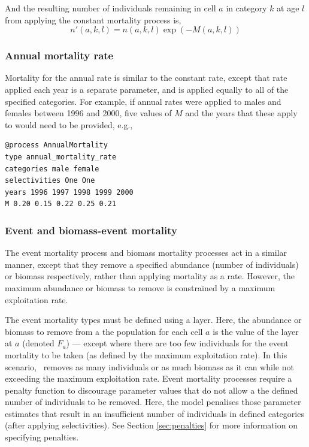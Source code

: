 And the resulting number of individuals remaining in cell $a$ in category $k$ at age $l$ from applying the constant mortality process is,
\begin{equation}
  n'(a,k,l) = n(a,k,l) \exp \left({-M(a,k,l)}\right)
\end{equation}

\subsubsection*{Annual mortality rate}

Mortality for the annual rate is similar to the constant rate, except that rate applied each year is a separate parameter, and is applied equally to all of the specified categories. For example, if annual rates were applied to males and females between 1996 and 2000, five values of $M$ and the years that these apply to would need to be provided, e.g., 

{\small{\begin{verbatim}
@process AnnualMortality
type annual_mortality_rate
categories male female
selectivities One One
years 1996 1997 1998 1999 2000
M 0.20 0.15 0.22 0.25 0.21
\end{verbatim}}}

\subsubsection*{Event and biomass-event mortality}

The event mortality process and biomass mortality processes act in a similar manner, except that they remove a specified abundance (number of individuals) or biomass respectively, rather than applying mortality as a rate. However, the maximum abundance or biomass to remove is constrained by a maximum exploitation rate.

The event mortality types must be defined using a layer. Here, the abundance or biomass to remove from a the population for each cell $a$ is the value of the layer at $a$ (denoted $F_a$) --- except where there are too few individuals for the event mortality to be taken (as defined by the maximum exploitation rate). In this scenario, \SPM\ removes as many individuals or as much biomass as it can while not exceeding the maximum exploitation rate. Event mortality processes require a penalty function to discourage parameter values that do not allow a the defined number of individuals to be removed. Here, the model penalises those parameter estimates that result in an insufficient number of individuals in defined categories (after applying selectivities). See Section \ref{sec:penalties} for more information on specifying penalties.

